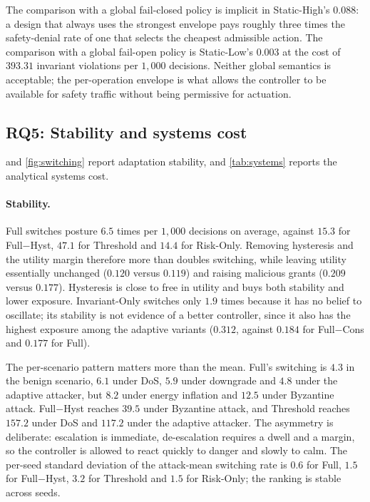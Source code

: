 The comparison with a global fail-closed policy is implicit in Static-High's
$0.088$: a design that always uses the strongest envelope pays roughly three
times the safety-denial rate of one that selects the cheapest admissible action.
The comparison with a global fail-open policy is Static-Low's $0.003$ at the cost
of $393.31$ invariant violations per $1{,}000$ decisions. Neither global semantics
is acceptable; the per-operation envelope is what allows the controller to be
available for safety traffic without being permissive for actuation.



\subsection{RQ5: Stability and systems cost}
\label{sec:rq5}

 and \cref{fig:switching} report adaptation stability, and
\cref{tab:systems} reports the analytical systems cost.

\paragraph{Stability.} Full switches posture $6.5$ times per $1{,}000$
decisions on average, against $15.3$ for Full$-$Hyst, $47.1$ for Threshold and
$14.4$ for Risk-Only. Removing hysteresis and the utility margin therefore more
than doubles switching, while leaving utility essentially unchanged ($0.120$
versus $0.119$) and raising malicious grants ($0.209$ versus $0.177$). Hysteresis is
close to free in utility and buys both stability and lower exposure. Invariant-Only
switches only $1.9$ times because it has no belief to oscillate; its stability is
not evidence of a better controller, since it also has the highest exposure among
the adaptive variants ($0.312$, against $0.184$ for Full$-$Cons and $0.177$ for
Full).

The per-scenario pattern matters more than the mean. Full's switching is $4.3$ in
the benign scenario, $6.1$ under DoS, $5.9$ under downgrade and $4.8$ under the
adaptive attacker, but $8.2$ under energy inflation and $12.5$ under Byzantine
attack. Full$-$Hyst reaches $39.5$ under Byzantine attack, and Threshold reaches
$157.2$ under DoS and $117.2$ under the adaptive attacker. The asymmetry is
deliberate: escalation is immediate, de-escalation requires a dwell and a margin,
so the controller is allowed to react quickly to danger and slowly to calm.
The per-seed standard deviation of the attack-mean switching rate is $0.6$ for
Full, $1.5$ for Full$-$Hyst, $3.2$ for Threshold and $1.5$ for Risk-Only; the
ranking is stable across seeds.

